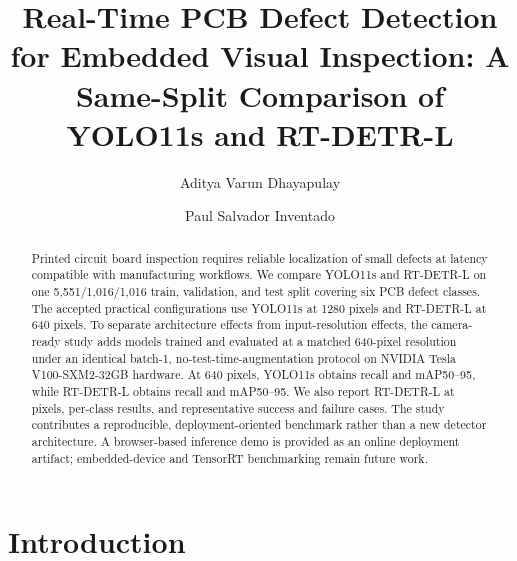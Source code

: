 \documentclass[runningheads]{llncs}
\begin{document}
\title{Real-Time PCB Defect Detection for Embedded Visual Inspection:
A Same-Split Comparison of YOLO11s and RT-DETR-L}


\author{Aditya Varun Dhayapulay
\and Paul Salvador Inventado}



\maketitle

\begin{abstract}
Printed circuit board inspection requires reliable localization of small
defects at latency compatible with manufacturing workflows. We compare
YOLO11s and RT-DETR-L on one 5,551/1,016/1,016 train, validation, and
test split covering six PCB defect classes. The accepted practical
configurations use YOLO11s at 1280 pixels and RT-DETR-L at 640 pixels.
To separate architecture effects from input-resolution effects, the
camera-ready study adds models trained and evaluated at a matched
640-pixel resolution under an identical batch-1, no-test-time-augmentation
protocol on NVIDIA Tesla V100-SXM2-32GB hardware. At 640 pixels,
YOLO11s obtains \MatchedYoloRecall{} recall and
\MatchedYoloMAPStrict{} mAP50--95, while RT-DETR-L obtains
\MatchedRTRecall{} recall and \MatchedRTMAPStrict{} mAP50--95.
We also report RT-DETR-L at \HighRTImageSize{} pixels, per-class results,
and representative success and failure cases. The study contributes a
reproducible, deployment-oriented benchmark rather than a new detector
architecture. A browser-based inference demo is provided as an online
deployment artifact; embedded-device and TensorRT benchmarking remain
future work.

\end{abstract}

\section{Introduction}
\end{document}
